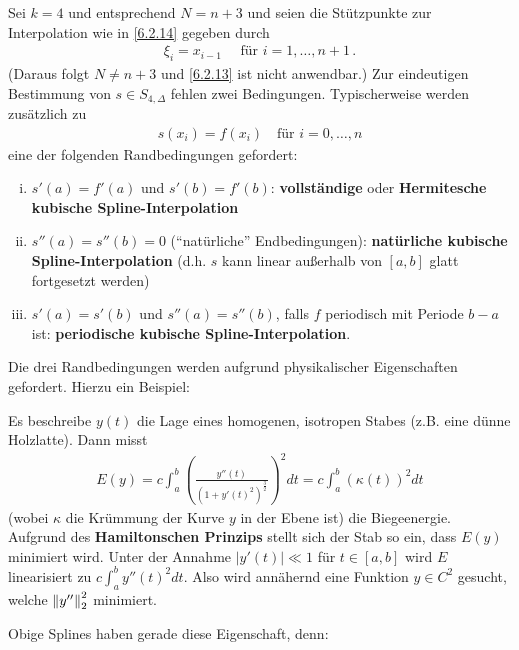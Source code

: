  \label{6.2.15}
Sei $k=4$ und entsprechend $N=n+3$ und 
seien die Stützpunkte zur Interpolation wie in \ref{6.2.14}
gegeben durch 
\begin{gather*}
  \xi_i = x_{i-1} \quad \text{ für } i=1, \dotsc, n+1\,.
\end{gather*}
(Daraus folgt $N\neq n+3$ und \ref{6.2.13} ist nicht anwendbar.)
Zur eindeutigen Bestimmung von $s\in S_{4,\Delta}$ fehlen zwei
Bedingungen.
Typischerweise werden 
zusätzlich zu 
\begin{gather*}
  s(x_i)=f(x_i) \quad \text{für } i=0,\dotsc,n
\end{gather*} 
eine der folgenden Randbedingungen gefordert:
\begin{enumerate}[i)]
\item $s'(a)=f'(a)$ und $s'(b)=f'(b)$: 
  \textbf{vollständige} oder \textbf{Hermitesche kubische 
    Spline-Interpolation} 
\item $s''(a)=s''(b)=0$ (\enquote{natürliche}  Endbedingungen):
  \textbf{natürliche kubische Spline-Interpolation}
  (d.h. $s$ kann linear außerhalb von $[a,b]$ glatt fortgesetzt
  werden) 
\item $s'(a)=s'(b)$ und $s''(a)=s''(b)$,
  falls $f$ periodisch mit Periode $b-a$ ist:
  \textbf{periodische kubische Spline-Interpolation}.
\end{enumerate}
Die drei Randbedingungen werden aufgrund physikalischer
Eigenschaften gefordert. Hierzu ein Beispiel: 

Es beschreibe $y(t)$ die Lage eines
homogenen, isotropen Stabes (z.B. eine dünne Holzlatte).
Dann misst
\begin{gather*}
  E(y) = c \int_a^b\left(
    \frac{y''(t)}{(1+y'(t)^2)^{\frac{3}{2}}}
  \right)^2dt
  = c \int_a^b\left(
    \kappa(t)
  \right)^2dt
\end{gather*}
(wobei $\kappa $ die Krümmung der Kurve $y$ in der Ebene ist) 
die Biegeenergie.
Aufgrund des \textbf{Hamiltonschen Prinzips}
stellt sich der Stab so ein, dass $E(y)$ minimiert wird.
Unter der Annahme $|y'(t)| \ll 1$ für $t\in [a,b]$ 
wird $E$ linearisiert zu $c\int_a^by''(t)^2dt$.
Also wird annähernd eine Funktion $y\in C^2$ gesucht,
welche $\nn[y'']_2^2$ minimiert.

Obige Splines haben gerade diese Eigenschaft, denn:

